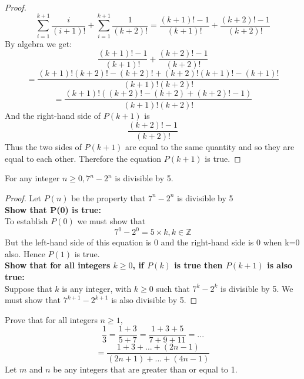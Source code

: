 \documentclass[12pt,letterpaper, onecolumn]{exam}
\begin{document}
\begin{questions}
\begin{solution}
\begin{proof}
		 		 $$\sum_{i=1}^{k+1}\frac{i}{(i+1)!}+\sum_{i=1}^{k+1}\frac{1}{(k+2)!}=\frac{(k+1)!-1}{(k+1)!}+\frac{(k+2)!-1}{(k+2)!}$$
		 		 By algebra we get:
		 		 $$\frac{(k+1)!-1}{(k+1)!}+\frac{(k+2)!-1}{(k+2)!}$$
		 		 $$=\frac{(k+1)!(k+2)!-(k+2)!+(k+2)!(k+1)!-(k+1)!}{(k+1)!(k+2)!}$$
		 		 $$=\frac{(k+1)!\left((k+2)!-(k+2)+(k+2)!-1\right)}{(k+1)!(k+2)!}$$
		 		 And the right-hand side of $P(k+1)$ is
		 		 $$\frac{(k+2)!-1}{(k+2)!}$$
		 		 Thus the two sides of $P(k+1)$ are equal to the same quantity and so they are equal to each other. Therefore the equation $P(k+1)$ is true.
		 	\end{proof}
		 \end{solution}
		 \setcounter{question}{11}\question For any integer $n\geq0, 7^n-2^n$ is divisible by 5.
		 \begin{solution}
		 	\begin{proof}
 				 	Let $P(n)$ be the property that $7^n-2^n$ is divisible by 5\\
 				 		\textbf{Show that P(0) is true:}\\
 				 	To establish $P(0)$ we must show that
 				 	$$7^0-2^0=5\times k, k\in\mathbb{Z}$$
 				 	But the left-hand side of this equation is 0 and the right-hand side is 0 when k=0
 				 	also. Hence $P(1)$ is true.\\
					\textbf{Show that for all integers $k\geq0$, if $P(k)$ is true then $P(k+1)$ is also true:}\\
					Suppose that $k$ is any integer, with $k\geq0$ such that $7^k-2^k$ is divisible by 5. We must show that $7^{k+1}-2^{k+1}$ is also divisible by 5.
		 \end{proof}
		 \end{solution}
		 \setcounter{question}{27}\question Prove that for all integers $n\geq1,$
		 $$\frac{1}{3}=\frac{1+3}{5+7}=\frac{1+3+5}{7+9+11}=...$$
		 $$=\frac{1+3+...+(2n-1)}{(2n+1)+...+(4n-1)}$$
		 \setcounter{question}{34}\question Let $m$ and $n$ be any integers that are greater than or equal to 1.
		\end{questions}
\end{document}
